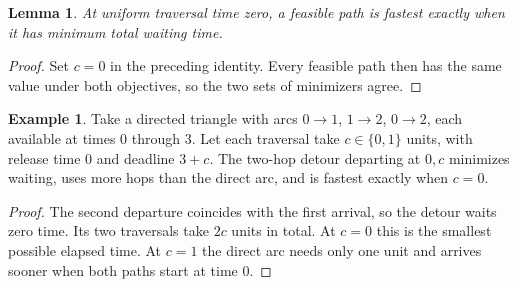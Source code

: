 \documentclass[11pt]{article}
\newtheorem{lemma}[theorem]{Lemma}
\theoremstyle{definition}
\newtheorem{example}[theorem]{Example}
\begin{document}
\begin{lemma}
At uniform traversal time zero, a feasible path is fastest exactly when it
has minimum total waiting time.
\end{lemma}

\begin{proof}
Set $c=0$ in the preceding identity. Every feasible path then has the same
value under both objectives, so the two sets of minimizers agree.
\end{proof}

\begin{example}
Take a directed triangle with arcs $0\to1$, $1\to2$, $0\to2$, each
available at times 0 through 3. Let each traversal take $c\in\{0,1\}$
units, with release time 0 and deadline $3+c$. The two-hop detour
departing at $0,c$ minimizes waiting, uses more hops than the direct arc,
and is fastest exactly when $c=0$.
\end{example}

\begin{proof}
The second departure coincides with the first arrival, so the detour waits
zero time. Its two traversals take $2c$ units in total. At $c=0$ this is
the smallest possible elapsed time. At $c=1$ the direct arc needs only
one unit and arrives sooner when both paths start at time 0.
\end{proof}
\end{document}
